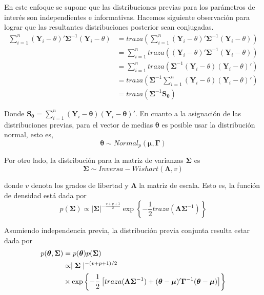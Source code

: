 \documentclass[
  10pt,
  spanish,
]{book}
\theoremstyle{definition}
\theoremstyle{definition}
\theoremstyle{definition}
\theoremstyle{definition}
\theoremstyle{remark}
\begin{document}
En este enfoque se supone que las distribuciones previas para los parámetros de interés son independientes e informativas. Hacemos siguiente observación para lograr que las resultantes distribuciones posterior sean conjugadas.
\begin{align*}
\sum_{i=1}^n(\mathbf{Y}_i-\theta)'\boldsymbol \Sigma^{-1}(\mathbf{Y}_i-\theta)&=traza \left(\sum_{i=1}^n(\mathbf{Y}_i-\theta)'\boldsymbol \Sigma^{-1}(\mathbf{Y}_i-\theta)\right)\\
&= \sum_{i=1}^n traza\left((\mathbf{Y}_i-\theta)'\boldsymbol \Sigma^{-1}(\mathbf{Y}_i-\theta)\right)\\
&= \sum_{i=1}^n traza\left(\boldsymbol \Sigma^{-1}(\mathbf{Y}_i-\theta)(\mathbf{Y}_i-\theta)'\right)\\
&= traza\left(\boldsymbol \Sigma^{-1}\sum_{i=1}^n(\mathbf{Y}_i-\theta)(\mathbf{Y}_i-\theta)'\right)\\
&= traza\left(\boldsymbol \Sigma^{-1}\mathbf{S}_{\boldsymbol \theta}\right)
\end{align*}

Donde \(\mathbf{S}_{\boldsymbol \theta}=\sum_{i=1}^n(\mathbf{Y}_i-\boldsymbol \theta)(\mathbf{Y}_i-\boldsymbol \theta)'\). En cuanto a la asignación de las distribuciones previas, para el vector de medias \(\boldsymbol \theta\) es posible usar la distribución normal, esto es,
\begin{equation*}
\boldsymbol \theta\sim Normal_p(\boldsymbol \mu,\boldsymbol \Gamma)
\end{equation*}

Por otro lado, la distribución para la matriz de varianzas \(\boldsymbol \Sigma\) es
\begin{equation*}
\boldsymbol \Sigma\sim Inversa-Wishart(\boldsymbol \Lambda,v)
\end{equation*}

donde \(v\) denota los grados de libertad y \(\boldsymbol \Lambda\) la matriz de escala. Esto es, la función de densidad está dada por
\begin{equation*}
p(\boldsymbol \Sigma)\propto |\boldsymbol \Sigma|^{-\frac{v+p+1}{2}}\exp\left\{-\frac{1}{2}traza(\boldsymbol \Lambda\boldsymbol \Sigma^{-1})\right\}
\end{equation*}

Asumiendo independencia previa, la distribución previa conjunta resulta estar dada por
\begin{align}
p(\boldsymbol \theta,\boldsymbol \Sigma)&=p(\boldsymbol \theta)p(\boldsymbol \Sigma)\notag\\
&\propto \mid \boldsymbol \Sigma\mid ^{-(v+p+1)/2}\notag\\
&\times
\exp\left\{ -\frac{1}{2}\left[traza(\boldsymbol \Lambda\boldsymbol \Sigma^{-1})+
(\boldsymbol \theta-\boldsymbol \mu)'\boldsymbol \Gamma^{-1}(\boldsymbol \theta-\boldsymbol \mu)\right]\right\}
\end{align}
\end{document}
